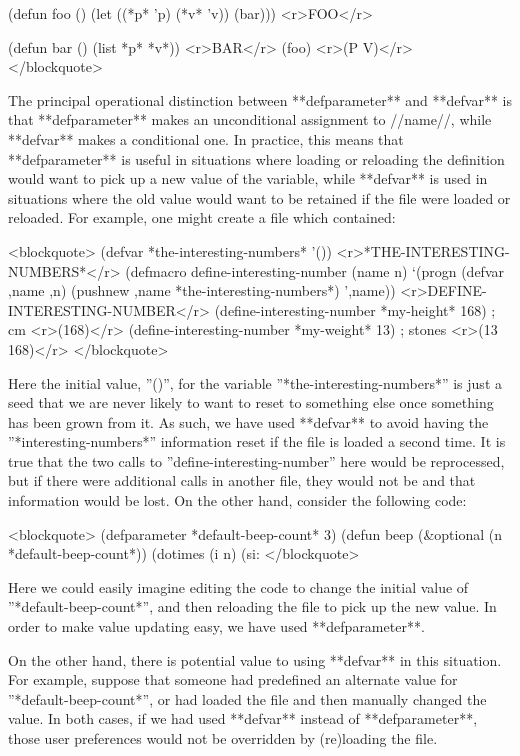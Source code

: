 (defun foo () 
  (let ((*p* 'p) (*v* 'v))
    (bar))) <r>FOO</r>

(defun bar ()
  (list *p* *v*)) <r>BAR</r>
(foo) <r>(P V)</r>
</blockquote>

The principal operational distinction between **defparameter** and **defvar** is that **defparameter** makes an unconditional assignment to //name//, while **defvar** makes a conditional one. In practice, this means that **defparameter** is useful in situations where loading or reloading the definition would want to pick up a new value of the variable, while **defvar** is used in situations where the old value would want to be retained if the file were loaded or reloaded. For example, one might create a file which contained:

<blockquote>
(defvar *the-interesting-numbers* '()) <r>*THE-INTERESTING-NUMBERS*</r>
(defmacro define-interesting-number (name n)
  `(progn (defvar ,name ,n)
     (pushnew ,name *the-interesting-numbers*) ',name)) <r>DEFINE-INTERESTING-NUMBER</r>
(define-interesting-number *my-height* 168) ; cm <r>(168)</r>
(define-interesting-number *my-weight* 13) ; stones <r>(13 168)</r>
</blockquote>

Here the initial value, ''()'', for the variable ''*the-interesting-numbers*'' is just a seed that we are never likely to want to reset to something else once something has been grown from it. As such, we have used **defvar** to avoid having the ''*interesting-numbers*'' information reset if the file is loaded a second time. It is true that the two calls to ''define-interesting-number'' here would be reprocessed, but if there were additional calls in another file, they would not be and that information would be lost. On the other hand, consider the following code:

<blockquote>
(defparameter *default-beep-count* 3)
(defun beep (&optional (n *default-beep-count*))
  (dotimes (i n) (si:%
</blockquote>

Here we could easily imagine editing the code to change the initial value of ''*default-beep-count*'', and then reloading the file to pick up the new value. In order to make value updating easy, we have used **defparameter**.

On the other hand, there is potential value to using **defvar** in this situation. For example, suppose that someone had predefined an alternate value for ''*default-beep-count*'', or had loaded the file and then manually changed the value. In both cases, if we had used **defvar** instead of **defparameter**, those user preferences would not be overridden by (re)loading the file.

